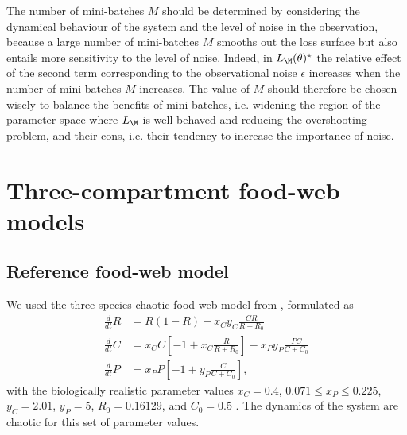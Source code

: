 The number of mini-batches $M$ should be determined by considering the dynamical behaviour of the system and the level of noise in the observation, because a large number of mini-batches $M$ smooths out the loss surface but also entails more sensitivity to the level of noise. Indeed, in $L_\M(\theta)^\star$ the relative effect of the second term corresponding to the observational noise $\epsilon$ increases when the number of mini-batches $M$ increases.
%
The value of $M$ should therefore be chosen wisely to balance the benefits of mini-batches, i.e. widening the region of the parameter space where $L_\M$ is well behaved and reducing the overshooting problem, and their cons, i.e. their tendency to increase the importance of noise. 

\section{Three-compartment food-web models}
\label{secSI:models}
\subsection{Reference food-web model}
We used the three-species chaotic food-web model from \citep{Hastings1991}, formulated as
\begin{equation}
    \begin{aligned}
        \tfrac{d}{dt} R &= R ( 1 - R ) - x_C y_C \frac{CR}{R + R_0}\\
        \tfrac{d}{dt} C &= x_C C \left[ -1 + x_C \frac{R}{R + R_0} \right] - x_P y_P \frac{PC}{C + C_0}\\
        \tfrac{d}{dt} P &= x_P P \left[ -1 + y_P \frac{C}{C+C_0} \right],
    \end{aligned}
\end{equation}
with the biologically realistic parameter values $x_C = 0.4$, $0.071 \leq x_P \leq 0.225 $, $y_C = 2.01$, $y_P = 5$, $R_0 = 0.16129$, and $C_0 = 0.5$ \citep{McCann1994}. The dynamics of the system are chaotic for this set of parameter values.

